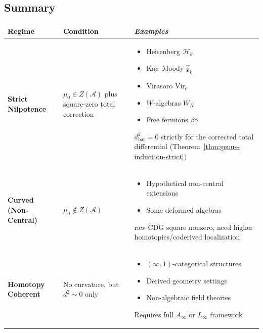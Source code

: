 \subsection{Summary}

\begin{center}
\begin{tabular}{|>{\raggedright\arraybackslash}p{3.5cm}|>{\raggedright\arraybackslash}p{4cm}|>{\raggedright\arraybackslash}p{6cm}|}
\hline
\textbf{Regime} & \textbf{Condition} & \emph{Examples} \\
\hline
\hline
\textbf{Strict Nilpotence} & $\mu_0 \in Z(\mathcal{A})$ plus square-zero total correction &
\begin{itemize}[leftmargin=*]
\item Heisenberg $\mathcal{H}_k$
\item Kac--Moody $\widehat{\mathfrak{g}}_k$
\item Virasoro $\text{Vir}_c$
\item $W$-algebras $W_N$
\item Free fermions $\beta\gamma$
\end{itemize}
$d_{\text{bar}}^2 = 0$ strictly for the corrected total differential (Theorem~\ref{thm:genus-induction-strict}) \\
\hline
\textbf{Curved (Non-Central)} & $\mu_0 \notin Z(\mathcal{A})$ &
\begin{itemize}[leftmargin=*]
\item Hypothetical non-central extensions
\item Some deformed algebras
\end{itemize}
raw CDG square nonzero, need higher homotopies/coderived localization \\
\hline
\textbf{Homotopy Coherent} & No curvature, but $d^2 \sim 0$ only &
\begin{itemize}[leftmargin=*]
\item $(\infty,1)$-categorical structures
\item Derived geometry settings
\item Non-algebraic field theories
\end{itemize}
Requires full $A_\infty$ or $L_\infty$ framework \\
\hline
\end{tabular}
\end{center}

